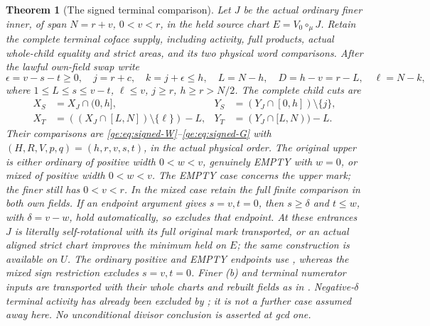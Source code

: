 \documentclass[11pt,a4paper]{amsart}
\numberwithin{equation}{section}
\theoremstyle{plain}
\newtheorem{theorem}{Theorem}[section]
\theoremstyle{definition}
\begin{document}
\begin{theorem}[The signed terminal comparison]\label{ge:terminal-signed}
Let \(J\) be the actual ordinary finer inner, of span \(N=r+v\),
\(0<v<r\), in the held source chart \(E=V_0\circ_\mu J\).  Retain
the complete terminal coface supply, including activity, full products,
actual whole-child equality and strict areas, and its two physical word
comparisons.  After the lawful own-field swap write
\[
 \epsilon=v-s-t\ge0,\quad j=r+c,\quad k=j+\epsilon\le h,
 \quad L=N-h,\quad D=h-v=r-L,\quad \ell=N-k,
\]
where \(1\le L\le s\le v-t\), \(\ell\le v\), \(j\ge r\),
\(h\ge r>N/2\).  The complete child cuts are
\begin{equation}\label{ge:eq:signed-cuts}
\begin{aligned}
 X_S&=X_J\cap(0,h],&Y_S&=(Y_J\cap[0,h])\setminus\{j\},\\
 X_T&=((X_J\cap[L,N])\setminus\{\ell\})-L,&
 Y_T&=(Y_J\cap[L,N))-L.
\end{aligned}
\end{equation}
Their comparisons are \eqref{ge:eq:signed-W}--\eqref{ge:eq:signed-G}
with \((H,R,V,p,q)=(h,r,v,s,t)\), in the actual physical order.
The original upper is either ordinary of positive width \(0<w<v\),
genuinely EMPTY with \(w=0\), or mixed of positive width \(0<w<v\).
The EMPTY case concerns the upper mark; the finer still has \(0<v<r\).
In the mixed case retain the full finite comparison in both own fields.
If an endpoint argument gives \(s=v,t=0\), then
\(s\ge\delta\) and \(t\le w\), with \(\delta=v-w\), hold automatically,
so  excludes that endpoint.
At these entrances \(J\) is literally self-rotational with its full
original mark transported, or an actual aligned strict chart improves
the minimum held on \(E\); the same construction is available on \(U\).
The ordinary positive and EMPTY endpoints use
, whereas the mixed sign restriction
excludes \(s=v,t=0\).  Finer (b) and terminal numerator inputs are
transported with their whole charts and rebuilt fields as in
.
Negative-\(\delta\) terminal activity has already been excluded by
; it is not a further case assumed away here.
No unconditional divisor conclusion is asserted at gcd one.
\end{theorem}
\end{document}
